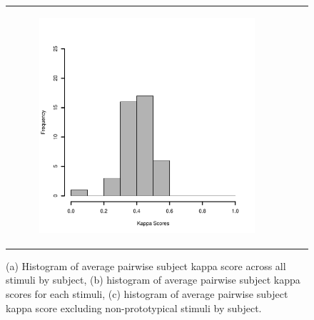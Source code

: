 \documentclass[11pt,letterpaper]{article}
\begin{document}
\begin{figure}
{\begin{tabular}{ccc}
\begin{subfigure}[b]{0.3\textwidth}\includegraphics[width=\textwidth]{figures/subj-kappa-hist-protostim.pdf}\caption{}\label{fig:subj-kappa-proto}\end{subfigure}
\end{tabular}
}
\caption{(a) Histogram of average pairwise subject kappa score across all stimuli by subject, (b) histogram of average pairwise subject kappa scores for each stimuli, (c) histogram of average pairwise subject kappa score excluding non-prototypical stimuli by subject.}
\label{fig:type-1-hists}
\end{figure}
\end{document}
